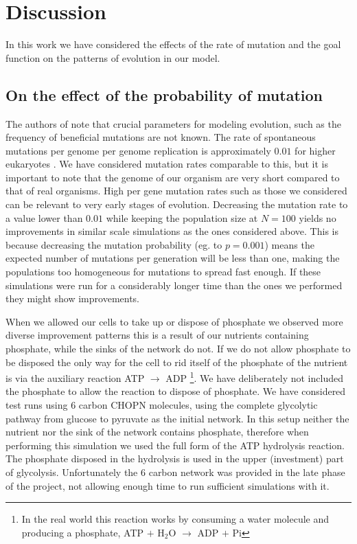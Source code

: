\documentclass[a4paper,12pt]{article}
\begin{document}
\section{Discussion}
\label{sec:discussion}

In this work we have considered the effects of the rate of mutation and the goal function on the patterns of evolution in our model. 

\subsection{On the effect of the probability of mutation}
\label{sub:on_the_effect_of_the_probability_of_mutation}


The authors of \cite{predictability} note that crucial parameters for modeling evolution, such as the frequency of beneficial mutations are not known. The rate of spontaneous mutations per genome per genome replication is approximately $0.01$ for higher eukaryotes \cite{mutationrate}. We have considered mutation rates comparable to this, but it is important to note that the genome of our organism are very short compared to that of real organisms. High per gene mutation rates such as those we considered can be relevant to very early stages of evolution. Decreasing the mutation rate to a value lower than $0.01$ while keeping the population size at $N=100$ yields no improvements in similar scale simulations as the ones considered above. This is because decreasing the mutation probability (eg. to $p=0.001$) means the expected number of mutations per generation will be less than one, making the populations too homogeneous for mutations to spread fast enough. If these simulations were run for a considerably longer time than the ones we performed they might show improvements. 


When we allowed our cells to take up or dispose of phosphate we observed more diverse improvement patterns this is a result of our nutrients containing phosphate, while the sinks of the network do not. If we do not allow phosphate to be disposed the only way for the cell to rid itself of the phosphate of the nutrient is via the auxiliary reaction ATP $\rightarrow$ ADP \footnote{In the real world this reaction works by consuming a water molecule and producing a phosphate, ATP $+$ H$_2$O $\rightarrow$ ADP $+$ Pi}. We have deliberately not included the phosphate to allow the reaction to dispose of phosphate. We have considered test runs using  $6$ carbon CHOPN molecules, using the complete glycolytic pathway from glucose to pyruvate as the initial network. In this setup neither the nutrient nor the sink of the network contains phosphate, therefore when performing this simulation we used the full form of the ATP hydrolysis reaction. The phosphate disposed in the hydrolysis is used in the upper (investment) part of glycolysis. Unfortunately the $6$ carbon network was provided in the late phase of the project, not allowing enough time to run sufficient simulations with it. 
\end{document}
